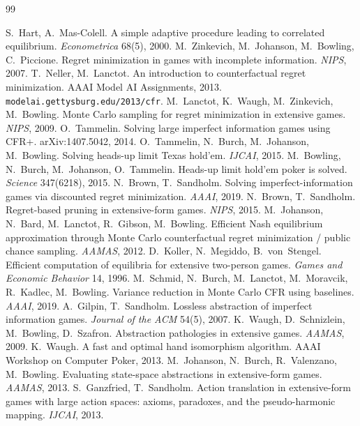 \begingroup
\footnotesize
\begin{thebibliography}{99}
\setlength{\itemsep}{1.5pt}

 S.~Hart, A.~Mas-Colell. A simple adaptive procedure leading to correlated equilibrium. \emph{Econometrica} 68(5), 2000.
 M.~Zinkevich, M.~Johanson, M.~Bowling, C.~Piccione. Regret minimization in games with incomplete information. \emph{NIPS}, 2007.
 T.~Neller, M.~Lanctot. An introduction to counterfactual regret minimization. AAAI Model AI Assignments, 2013. \texttt{modelai.gettysburg.edu/2013/cfr}.
 M.~Lanctot, K.~Waugh, M.~Zinkevich, M.~Bowling. Monte Carlo sampling for regret minimization in extensive games. \emph{NIPS}, 2009.
 O.~Tammelin. Solving large imperfect information games using CFR+. arXiv:1407.5042, 2014.
 O.~Tammelin, N.~Burch, M.~Johanson, M.~Bowling. Solving heads-up limit Texas hold'em. \emph{IJCAI}, 2015.
 M.~Bowling, N.~Burch, M.~Johanson, O.~Tammelin. Heads-up limit hold'em poker is solved. \emph{Science} 347(6218), 2015.
 N.~Brown, T.~Sandholm. Solving imperfect-information games via discounted regret minimization. \emph{AAAI}, 2019.
 N.~Brown, T.~Sandholm. Regret-based pruning in extensive-form games. \emph{NIPS}, 2015.
 M.~Johanson, N.~Bard, M.~Lanctot, R.~Gibson, M.~Bowling. Efficient Nash equilibrium approximation through Monte Carlo counterfactual regret minimization / public chance sampling. \emph{AAMAS}, 2012.
 D.~Koller, N.~Megiddo, B.~von~Stengel. Efficient computation of equilibria for extensive two-person games. \emph{Games and Economic Behavior} 14, 1996.
 M.~Schmid, N.~Burch, M.~Lanctot, M.~Moravcik, R.~Kadlec, M.~Bowling. Variance reduction in Monte Carlo CFR using baselines. \emph{AAAI}, 2019.
 A.~Gilpin, T.~Sandholm. Lossless abstraction of imperfect information games. \emph{Journal of the ACM} 54(5), 2007.
 K.~Waugh, D.~Schnizlein, M.~Bowling, D.~Szafron. Abstraction pathologies in extensive games. \emph{AAMAS}, 2009.
 K.~Waugh. A fast and optimal hand isomorphism algorithm. AAAI Workshop on Computer Poker, 2013.
 M.~Johanson, N.~Burch, R.~Valenzano, M.~Bowling. Evaluating state-space abstractions in extensive-form games. \emph{AAMAS}, 2013.
 S.~Ganzfried, T.~Sandholm. Action translation in extensive-form games with large action spaces: axioms, paradoxes, and the pseudo-harmonic mapping. \emph{IJCAI}, 2013.

\end{thebibliography}
